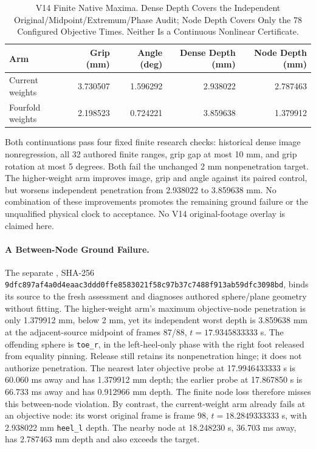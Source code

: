 \documentclass[11pt,letterpaper]{article}
\newcommand{\code}[1]{\nolinkurl{#1}}
\newcommand{\hash}[1]{{\footnotesize\nolinkurl{#1}}}
\begin{document}
\begin{table}[ht]\centering\small
\begin{tabular}{@{}lrrrr@{}}
\toprule Arm & Grip (mm) & Angle (deg) & Dense Depth (mm) & Node Depth (mm)\\\midrule
Current weights & 3.730507 & 1.596292 & 2.938022 & 2.787463\\
Fourfold weights & 2.198523 & 0.724221 & 3.859638 & 1.379912\\
\bottomrule
\end{tabular}
\caption{V14 Finite Native Maxima. Dense Depth Covers the Independent
Original/Midpoint/Extremum/Phase Audit; Node Depth Covers Only the 78
Configured Objective Times. Neither Is a Continuous Nonlinear Certificate.}
\end{table}
Both continuations pass four fixed finite research checks: historical dense
image nonregression, all 32 authored finite ranges, grip gap at most 10 mm,
and grip rotation at most 5 degrees. Both fail the unchanged 2 mm
nonpenetration target. The higher-weight arm improves image, grip and angle
against its paired control, but worsens independent penetration from
2.938022 to 3.859638 mm. No combination of these improvements promotes the
remaining ground failure or the unqualified physical clock to acceptance.
No V14 original-footage overlay is claimed here.

\paragraph{A Between-Node Ground Failure.}
The separate , SHA-256
\hash{9dfc897af4a0d4eaac3ddd0ffe8583021f58c97b37c7488f913ab59dfc3098bd},
binds its source to the fresh assessment and diagnoses authored sphere/plane
geometry without fitting. The higher-weight arm's maximum objective-node
penetration is only 1.379912 mm, below 2 mm, yet its independent worst depth
is 3.859638 mm at the adjacent-source midpoint of frames 87/88,
$t=17.9345833333$ s. The offending sphere is \code{toe_r}, in the left-heel-only
phase with the right foot released from equality pinning. Release still
retains its nonpenetration hinge; it does not authorize penetration.
The nearest later objective probe at 17.9946433333 s is 60.060 ms away and
has 1.379912 mm depth; the earlier probe at 17.867850 s is 66.733 ms away
and has 0.912966 mm depth. The finite node loss therefore misses this
between-node violation. By contrast, the current-weight arm already fails
at an objective node: its worst original frame is frame 98,
$t=18.2849333333$ s, with 2.938022 mm \code{heel_l} depth. The nearby node at
18.248230 s, 36.703 ms away, has 2.787463 mm depth and also exceeds the target.
\end{document}

